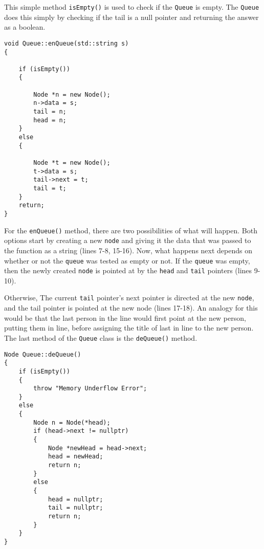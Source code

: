 \documentclass[letterpaper, 10pt]{article}
\begin{document}
This simple method \texttt{isEmpty()} is used to check if the \texttt{Queue} is empty. The \texttt{Queue} does this simply by checking if the tail is a null pointer and returning the answer as a boolean.

\begin{addmargin}[-5em]{1em}
\begin{small}
\begin{verbatim}
void Queue::enQueue(std::string s)
{

	if (isEmpty())
	{

		Node *n = new Node();
		n->data = s;
		tail = n;
		head = n;
	}
	else
	{

		Node *t = new Node();
		t->data = s;
		tail->next = t;
		tail = t;
	}
	return;
}
\end{verbatim}
\end{small}
\end{addmargin}

For the \texttt{enQueue()} method, there are two possibilities of what will happen. Both options start by creating a new \texttt{node} and giving it the data that was passed to the function as a string (lines 7-8, 15-16). Now, what happens next depends on whether or not the \texttt{queue} was tested as empty or not. If the \texttt{queue} was empty, then the newly created \texttt{node} is pointed at by the \texttt{head} and \texttt{tail} pointers (lines 9-10).

Otherwise, The current \texttt{tail} pointer's next pointer is directed at the new \texttt{node}, and the tail pointer is pointed at the new node (lines 17-18). An analogy for this would be that the last person in the line would first point at the new person, putting them in line, before assigning the title of last in line to the new person. The last method of the \texttt{Queue} class is the \texttt{deQueue()} method.

\begin{addmargin}[-5em]{1em}
\begin{small}
\begin{verbatim}
Node Queue::deQueue()
{
	if (isEmpty())
	{
		throw "Memory Underflow Error";
	}
	else
	{
		Node n = Node(*head);
		if (head->next != nullptr)
		{
			Node *newHead = head->next;
			head = newHead;
			return n;
		}
		else
		{
			head = nullptr;
			tail = nullptr;
			return n;
		}
	}
}
\end{verbatim}
\end{small}
\end{addmargin}
\end{document}
